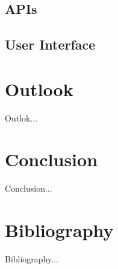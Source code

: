 \documentclass[a4paper, 12pt, headsepline]{scrartcl}
\begin{document}
\subsection{APIs}


\subsection{User Interface}

\section{Outlook}
Outlok...

\section{Conclusion}
Conclusion...

\section{Bibliography}
Bibliography...
\end{document}

